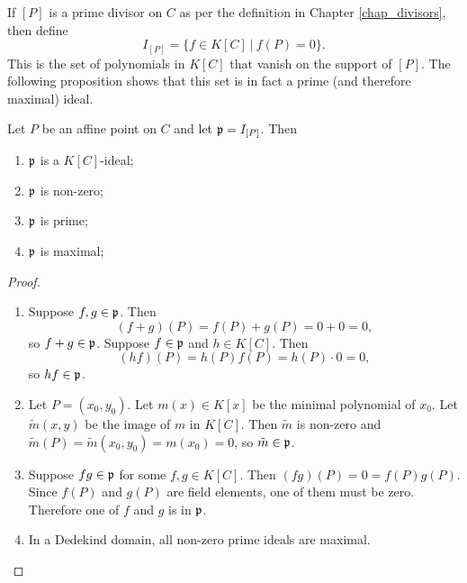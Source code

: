 If $[P]$ is a prime divisor on $C$ as per the definition in Chapter \ref{chap_divisors}, then define
\[ I_{[P]} = \{ f \in K[C] ~|~ f(P) = 0 \}. \]
This is the set of polynomials in $K[C]$ that vanish on the support of $[P]$.
The following proposition shows that this set is in fact a prime (and therefore maximal) ideal.

\begin{proposition}
  \label{prop_I_P_is_prime}
  Let $P$ be an affine point on $C$ and let $\frak p = I_{[P]}$. Then
  \begin{enumerate}[label=(\roman*)]
    \item $\frak p$ is a $K[C]$-ideal;
    \item $\frak p$ is non-zero;
    \item $\frak p$ is prime;
    \item $\frak p$ is maximal;
  \end{enumerate}
\end{proposition}
\begin{proof}
  \begin{enumerate}[label=(\roman*)]
    \item
    Suppose $f, g \in \frak p$. Then
      \[ (f + g)(P) = f(P) + g(P) = 0 + 0 = 0, \]
    so $f + g \in \frak p$.
    Suppose $f \in \frak p$ and $h \in K[C]$. Then
      \[ (hf)(P) = h(P)f(P) = h(P)\cdot 0 = 0, \]
    so $hf \in \frak p$.
    
    \item
    Let $P = (x_0, y_0)$.
    Let $m(x) \in K[x]$ be the minimal polynomial of $x_0$.
    Let $\tilde m(x,y)$ be the image of $m$ in $K[C]$.
    Then $\tilde m$ is non-zero and $\tilde m(P) = \tilde m(x_0, y_0) = m(x_0) = 0$,
    so $\tilde m \in \frak p$.
    
    \item
    Suppose $fg \in \frak p$ for some $f, g \in K[C]$.
    Then $(fg)(P) = 0 = f(P)g(P)$.
    Since $f(P)$ and $g(P)$ are field elements, one of them must be zero.
    Therefore one of $f$ and $g$ is in $\frak p$.
    
    \item
    In a Dedekind domain, all non-zero prime ideals are maximal.
    
  \end{enumerate}
\end{proof}

